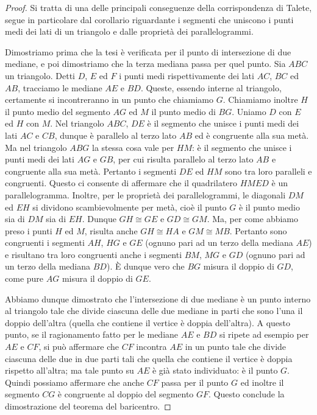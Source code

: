 \begin{proof}
Si tratta di una delle principali conseguenze della corrispondenza di 
Talete, segue in particolare dal corollario riguardante i segmenti 
che uniscono i punti medi dei lati di un triangolo e dalle proprietà 
dei parallelogrammi.

Dimostriamo prima che la tesi è verificata per il punto di 
intersezione di due mediane, e poi dimostriamo che la terza mediana 
passa per quel punto.
Sia \(ABC\) un triangolo. Detti \(D\), \(E\) ed \(F\) i punti medi 
rispettivamente dei lati \(AC\), \(BC\) ed \(AB\), tracciamo le mediane 
\(AE\) e \(BD\). Queste, essendo interne al triangolo, certamente si 
incontreranno in un punto che chiamiamo \(G\). Chiamiamo inoltre \(H\) il 
punto medio del segmento \(AG\) ed \(M\) il punto medio di \(BG\). Uniamo 
\(D\) con \(E\) ed \(H\) con \(M\). Nel triangolo \(ABC\), \(DE\) è il segmento 
che unisce i punti medi dei lati \(AC\) e \(CB\), dunque è parallelo al 
terzo lato \(AB\) ed è congruente alla sua metà. Ma nel triangolo \(ABG\) 
la stessa cosa vale per \(HM\): è il segmento che unisce i punti medi 
dei lati \(AG\) e \(GB\), per cui risulta parallelo al terzo lato \(AB\) e 
congruente alla sua metà. Pertanto i segmenti \(DE\) ed \(HM\) sono tra 
loro paralleli e congruenti. Questo ci consente di affermare che il 
quadrilatero \(HMED\) è un parallelogramma. Inoltre, per le proprietà 
dei parallelogrammi, le diagonali \(DM\) ed \(EH\) si dividono 
scambievolmente per metà, cioè il punto \(G\) è il punto medio sia di 
\(DM\) sia di \(EH\). Dunque \(GH\cong GE\) e \(GD\cong GM\). Ma, per come 
abbiamo preso i punti \(H\) ed \(M\), risulta anche \(GH\cong HA\) e 
\(GM\cong MB\). Pertanto sono congruenti i segmenti \(AH\), \(HG\) e \(GE\) 
(ognuno pari ad un terzo della mediana \(AE\)) e risultano tra loro 
congruenti anche i segmenti \(BM\), \(MG\) e \(GD\) (ognuno pari ad un 
terzo della mediana \(BD\)). \`E dunque vero che \(BG\) misura il doppio 
di \(GD\), come pure \(AG\) misura il doppio di \(GE\).

Abbiamo dunque dimostrato che l'intersezione di due mediane è un 
punto interno al triangolo tale che divide ciascuna delle due mediane 
in parti che sono l'una il doppio dell'altra (quella che contiene il 
vertice è doppia dell'altra).
A questo punto, se il ragionamento fatto per le mediane \(AE\) e \(BD\) 
si ripete ad esempio per \(AE\) e \(CF\), si può affermare che \(CF\) 
incontra \(AE\) in un punto tale che divide ciascuna delle due in due 
parti tali che quella che contiene il vertice è doppia rispetto 
all'altra; ma tale punto su \(AE\) è già stato individuato: è il punto 
\(G\). Quindi possiamo affermare che anche \(CF\) passa per il punto \(G\) 
ed inoltre il segmento \(CG\) è congruente al doppio del segmento \(GF\). 
Questo conclude la dimostrazione del teorema del baricentro.
\end{proof}

